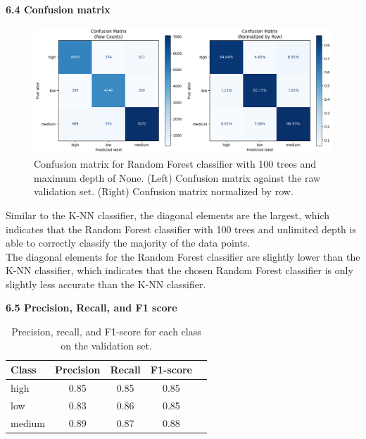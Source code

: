 \documentclass[12pt]{article}
\begin{document}
\textbf{6.4 Confusion matrix}
\\
\begin{figure}[H]
\centering
\includegraphics[width=1\textwidth]{figures/rf_confusion_matrix.png}
\caption{Confusion matrix for Random Forest classifier with 100 trees and maximum depth of None. (Left) Confusion matrix against the raw validation set. (Right) Confusion matrix normalized by row.}
\label{fig:rf_confusion_matrix}
\end{figure}

Similar to the K-NN classifier, the diagonal elements are the largest, which indicates that the Random Forest classifier with 100 trees and unlimited depth is able to correctly classify the majority of the data points. 
\\
The diagonal elements for the Random Forest classifier are slightly lower than the K-NN classifier, which indicates that the chosen Random Forest classifier is only slightly less accurate than the K-NN classifier.

\vspace{20pt}

\textbf{6.5 Precision, Recall, and F1 score}
\\

\begin{table}[h!]
\centering
\begin{tabular}{lcccc}
\hline
\textbf{Class} & \textbf{Precision} & \textbf{Recall} & \textbf{F1-score} \\
\hline
high   & 0.85 & 0.85 & 0.85 & \\
low    & 0.83 & 0.86 & 0.85 & \\
medium & 0.89 & 0.87 & 0.88 & \\
\hline
\end{tabular}
\caption{Precision, recall, and F1-score for each class on the validation set.}
\label{tab:rf_classification_report}
\end{table}
\end{document}
